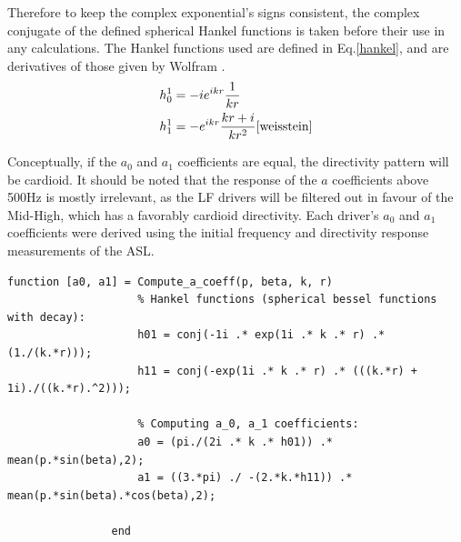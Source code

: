 \documentclass{report}
\begin{document}
            Therefore to keep the complex exponential's signs consistent, the complex conjugate of the defined spherical Hankel functions is taken before their use in any calculations.
            The Hankel functions used are defined in Eq.\ref{hankel}, and are derivatives of those given by Wolfram \cite{weisstein}.
            \begin{equation}
                \begin{split}
                    h_0^1 &= -i  e^{ikr}  \frac{1}{kr} \\
                    h_1^1 &= -e^{ikr}  \frac{kr + i}{kr^2}
                    \label{hankel} \cite{weisstein}
                \end{split}
            \end{equation}

            Conceptually, if the $a_0$ and $a_1$ coefficients are equal, the directivity pattern will be cardioid.
            It should be noted that the response of the $a$ coefficients above 500Hz is mostly irrelevant, as the LF drivers will be filtered out in favour of the Mid-High, which has a favorably cardioid directivity.
            Each driver's $a_0$ and $a_1$ coefficients were derived using the initial frequency and directivity response measurements of the ASL.
            \begin{lstlisting}[style=Matlab-editor, gobble=16]
                function [a0, a1] = Compute_a_coeff(p, beta, k, r)
                    % Hankel functions (spherical bessel functions with decay):
                    h01 = conj(-1i .* exp(1i .* k .* r) .* (1./(k.*r)));
                    h11 = conj(-exp(1i .* k .* r) .* (((k.*r) + 1i)./((k.*r).^2)));

                    % Computing a_0, a_1 coefficients:
                    a0 = (pi./(2i .* k .* h01)) .* mean(p.*sin(beta),2);
                    a1 = ((3.*pi) ./ -(2.*k.*h11)) .* mean(p.*sin(beta).*cos(beta),2);
                
                end
            \end{lstlisting}
\end{document}

